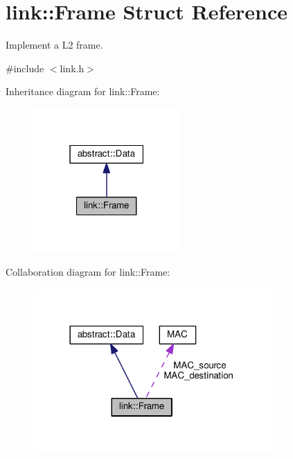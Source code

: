 \hypertarget{structlink_1_1Frame}{}\section{link\+:\+:Frame Struct Reference}
\label{structlink_1_1Frame}


Implement a L2 frame.  




{\ttfamily \#include $<$link.\+h$>$}



Inheritance diagram for link\+:\+:Frame\+:\nopagebreak
\begin{figure}[H]
\begin{center}
\leavevmode
\includegraphics[width=159pt]{structlink_1_1Frame__inherit__graph}
\end{center}
\end{figure}


Collaboration diagram for link\+:\+:Frame\+:\nopagebreak
\begin{figure}[H]
\begin{center}
\leavevmode
\includegraphics[width=258pt]{structlink_1_1Frame__coll__graph}
\end{center}
\end{figure}
